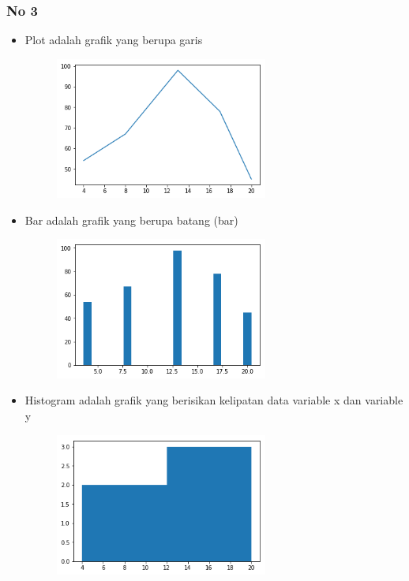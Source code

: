 \subsubsection{No 3}
\begin{itemize}
\item Plot adalah grafik yang berupa garis

\begin{figure}[H]
\centering
\includegraphics[width=7cm]{figures/6/1174071/Teori/plot.png}
\end{figure}

\item Bar adalah grafik yang berupa batang (bar)

\begin{figure}[H]
\centering
\includegraphics[width=7cm]{figures/6/1174071/Teori/bar.png}
\end{figure}

\item Histogram adalah grafik yang berisikan kelipatan data variable x dan variable y

\begin{figure}[H]
\centering
\includegraphics[width=7cm]{figures/6/1174071/Teori/hist.png}
\end{figure}


\end{itemize}
